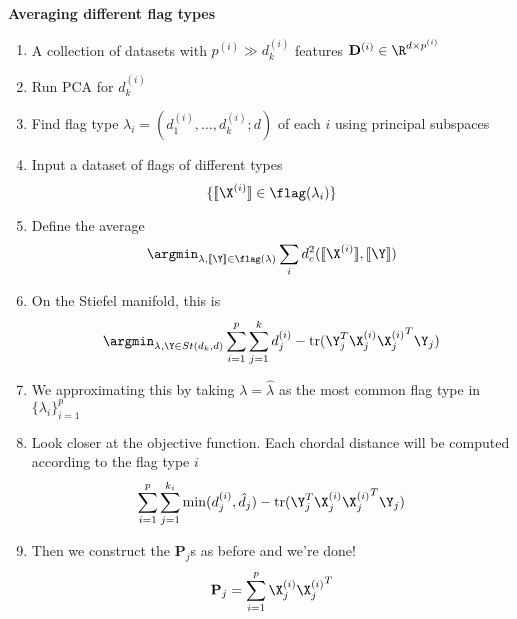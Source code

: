 \textbf{Averaging different flag types}
\begin{enumerate}
    \item A collection of datasets with $p^{(i)} \gg d_k^{(i)}$ features $\mathbf{D}^{(i)} \in \R^{d \times p^{(i)}}$
    \item Run PCA for $d_k^{(i)}$
    \item Find flag type $\lambda_i = (d_1^{(i)},\dots,d_k^{(i)};d)$ of each $i$ using principal subspaces
    \item Input a dataset of flags of different types
    \begin{equation*}
        \{[\![ \X^{(i)} ] \!] \in \flag(\lambda_i)\}
    \end{equation*}
    \item Define the average
    \begin{equation*}
        \argmin_{\lambda, [\![\Y]\!] \in \flag(\lambda)} \sum_{i} d_c^2 ([\![ \X^{(i)} ] \!],[\![\Y]\!])
    \end{equation*}
    \item On the Stiefel manifold, this is
    \begin{equation*}
        \argmin_{\lambda, \Y \in St(d_k,d)} \sum_{i=1}^p \sum_{j=1}^{k} d_j^{(i)} - \text{tr}(\Y_j^T\X_j^{(i)}{\X_j^{(i)}}^T\Y_j)
    \end{equation*}
    \item We approximating this by taking $\lambda= \hat{\lambda}$ as the most common flag type in $\{\lambda_i\}_{i=1}^p$
    \item Look closer at the objective function. Each chordal distance will be computed according to the flag type $i$
    \begin{equation*}
        \sum_{i=1}^p \sum_{j=1}^{k_i} \min(d_j^{(i)},\hat{d}_j)  - \text{tr}(\Y_j^T\X_j^{(i)}{\X_j^{(i)}}^T\Y_j)
    \end{equation*}
    \item Then we construct the $\mathbf{P}_j$s as before and we're done!
    \begin{equation*}
        \mathbf{P}_j = \sum_{i=1}^p\X_j^{(i)}{\X_j^{(i)}}^T
    \end{equation*}
    \end{enumerate}

